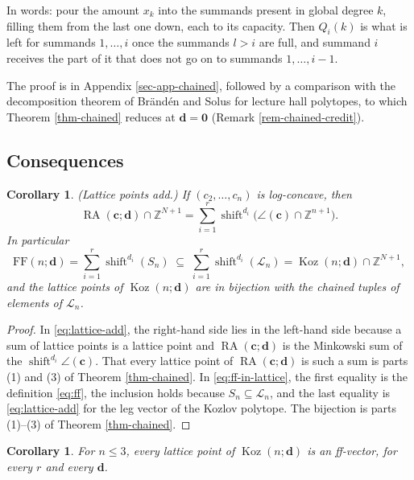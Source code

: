 \documentclass[11pt, a4paper, abstract=yes]{scrartcl}
\theoremstyle{definition}
\theoremstyle{remark}
\theoremstyle{plain}
\newtheorem{corollary}[definition]{Corollary}
\newcommand{\vek}[1]{\boldsymbol{#1}}
\theoremstyle{remark}
\theoremstyle{plain}
\newcommand{\Koz}{\operatorname{Koz}}
\newcommand{\shift}{\operatorname{shift}}
\newcommand{\rasimp}{\angle}
\newcommand{\RA}{\operatorname{RA}}
\newcommand{\FF}{\mathrm{FF}}
\newcommand{\leandiscof}[1]{\tikz[baseline=-0.6ex]\fill[#1] (0,0) circle (0.6ex);}
\newcommand{\leanfull}{\leandiscof{leanfull}}
\newcommand{\leanmark}[1]{\leavevmode{\reversemarginpar\marginnote{\raggedleft#1}}}
\begin{document}
In words: pour the amount \(x_k\) into the summands present in global degree \(k\), filling them
from the last one down, each to its capacity. Then \(Q_i(k)\) is what is left for summands
\(1,\dots,i\) once the summands \(l>i\) are full, and summand \(i\) receives the part of it that
does not go on to summands \(1,\dots,i-1\).

The proof is in Appendix \ref{sec-app-chained}, followed by a comparison with the decomposition
theorem of Brändén and Solus for lecture hall polytopes, to which Theorem \ref{thm-chained} reduces at
\(\vek d=\vek 0\) (Remark \ref{rem-chained-credit}).
\subsection{Consequences}
\label{sec:org9af5fd0}

\begin{corollary}
\leanmark{\leanfull}(\emph{Lattice points add.}) If \((c_2,\dots,c_n)\) is log-concave, then
\begin{equation}\label{eq:lattice-add}
  \RA(\vek c;\vek d)\cap\mathbb Z^{N+1}=\sum_{i=1}^r\shift^{d_i}\bigl(\rasimp(\vek c)\cap\mathbb Z^{n+1}\bigr).
\end{equation}
In particular
\begin{equation}\label{eq:ff-in-lattice}
  \FF(n;\vek d)=\sum_{i=1}^r\shift^{d_i}(S_n)\;\subseteq\;\sum_{i=1}^r\shift^{d_i}(\mathcal L_n)=\Koz(n;\vek d)\cap\mathbb Z^{N+1},
\end{equation}
and the lattice points of \(\Koz(n;\vek d)\) are in bijection with the chained tuples of
elements of \(\mathcal L_n\).
\label{cor-additivity}
\end{corollary}

\begin{proof}
In \eqref{eq:lattice-add}, the right-hand side lies in the left-hand side because a sum of lattice
points is a lattice point and \(\RA(\vek c;\vek d)\) is the Minkowski sum of the
\(\shift^{d_i}\rasimp(\vek c)\). That every lattice point of \(\RA(\vek c;\vek d)\) is such a sum is
parts (1) and (3) of Theorem \ref{thm-chained}. In \eqref{eq:ff-in-lattice}, the first equality is the
definition \eqref{eq:ff}, the inclusion holds because \(S_n\subseteq\mathcal L_n\), and the last
equality is \eqref{eq:lattice-add} for the leg vector of the Kozlov polytope. The bijection is
parts (1)--(3) of Theorem \ref{thm-chained}.
\end{proof}

\begin{corollary}
\leanmark{\leanfull}For \(n\le3\), every lattice point of \(\Koz(n;\vek d)\) is an ff-vector, for every \(r\) and every
\(\vek d\).
\label{cor-small-n}
\end{corollary}
\end{document}
